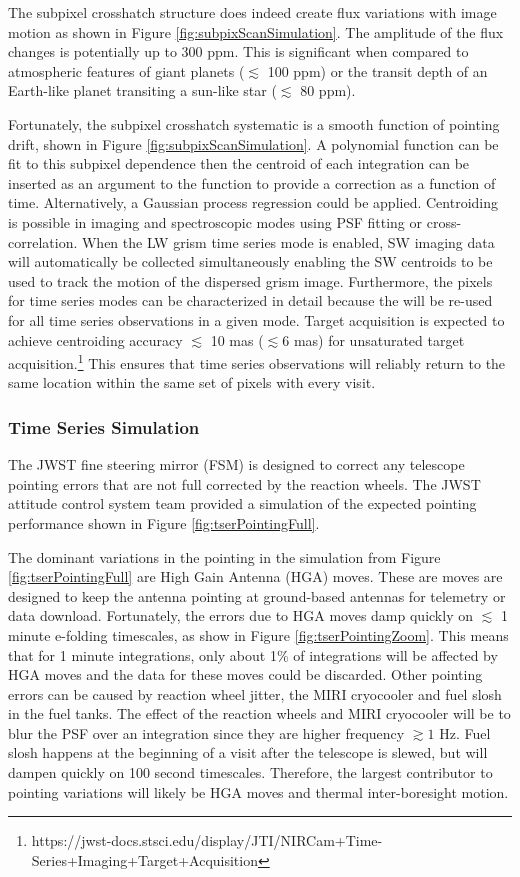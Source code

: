 \documentclass{aastex62}
\begin{document}
The subpixel crosshatch structure does indeed create flux variations with image motion as shown in Figure \ref{fig:subpixScanSimulation}.
The amplitude of the flux changes is potentially up to 300 ppm.
This is significant when compared to atmospheric features of giant planets ($\lesssim$ 100 ppm) or the transit depth of an Earth-like planet transiting a sun-like star ($\lesssim$ 80 ppm).

Fortunately, the subpixel crosshatch systematic is a smooth function of pointing drift, shown in Figure \ref{fig:subpixScanSimulation}.
A polynomial function can be fit to this subpixel dependence then the centroid of each integration can be inserted as an argument to the function to provide a correction as a function of time.
Alternatively, a Gaussian process regression could be applied.
Centroiding is possible in imaging and spectroscopic modes using PSF fitting or cross-correlation.
When the LW grism time series mode is enabled, SW imaging data will automatically be collected simultaneously enabling the SW centroids to be used to track the motion of the dispersed grism image.
Furthermore, the pixels for time series modes can be characterized in detail because the will be re-used for all time series observations in a given mode.
Target acquisition is expected to achieve centroiding accuracy $\lesssim$ 10 mas ($\lesssim 6$ mas) for unsaturated target acquisition.\footnote{https://jwst-docs.stsci.edu/display/JTI/NIRCam+Time-Series+Imaging+Target+Acquisition}
This ensures that time series observations will reliably return to the same location within the same set of pixels with every visit.

\subsubsection{Time Series Simulation}
The JWST fine steering mirror (FSM) is designed to correct any telescope pointing errors that are not full corrected by the reaction wheels.
The JWST attitude control system team provided a simulation of the expected pointing performance shown in Figure \ref{fig:tserPointingFull}.

The dominant variations in the pointing in the simulation from Figure \ref{fig:tserPointingFull} are High Gain Antenna (HGA) moves.
These are moves are designed to keep the antenna pointing at ground-based antennas for telemetry or data download.
Fortunately, the errors due to HGA moves damp quickly on $\lesssim$ 1 minute e-folding timescales, as show in Figure \ref{fig:tserPointingZoom}.
This means that for 1 minute integrations, only about 1\% of integrations will be affected by HGA moves and the data for these moves could be discarded.
Other pointing errors can be caused by reaction wheel jitter, the MIRI cryocooler and fuel slosh in the fuel tanks.
The effect of the reaction wheels and MIRI cryocooler will be to blur the PSF over an integration since they are higher frequency $\gtrsim 1$ Hz.
Fuel slosh happens at the beginning of a visit after the telescope is slewed, but will dampen quickly on 100 second timescales.
Therefore, the largest contributor to pointing variations will likely be HGA moves and thermal inter-boresight motion.
\end{document}
